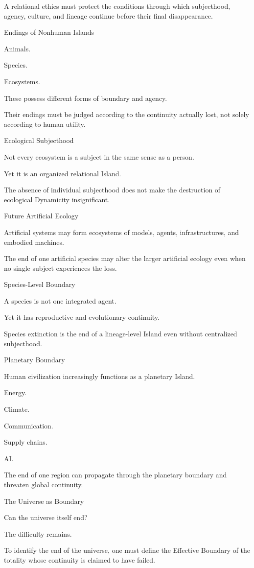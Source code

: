 A relational ethics must protect the conditions through which subjecthood, agency, culture, and lineage continue before their final disappearance.

Endings of Nonhuman Islands

Animals.

Species.

Ecosystems.

These possess different forms of boundary and agency.

Their endings must be judged according to the continuity actually lost, not solely according to human utility.

Ecological Subjecthood

Not every ecosystem is a subject in the same sense as a person.

Yet it is an organized relational Island.

The absence of individual subjecthood does not make the destruction of ecological Dynamicity insignificant.

Future Artificial Ecology

Artificial systems may form ecosystems of models, agents, infrastructures, and embodied machines.

The end of one artificial species may alter the larger artificial ecology even when no single subject experiences the loss.

Species-Level Boundary

A species is not one integrated agent.

Yet it has reproductive and evolutionary continuity.

Species extinction is the end of a lineage-level Island even without centralized subjecthood.

Planetary Boundary

Human civilization increasingly functions as a planetary Island.

Energy.

Climate.

Communication.

Supply chains.

AI.

The end of one region can propagate through the planetary boundary and threaten global continuity.

The Universe as Boundary

Can the universe itself end?

The difficulty remains.

To identify the end of the universe, one must define the Effective Boundary of the totality whose continuity is claimed to have failed.

